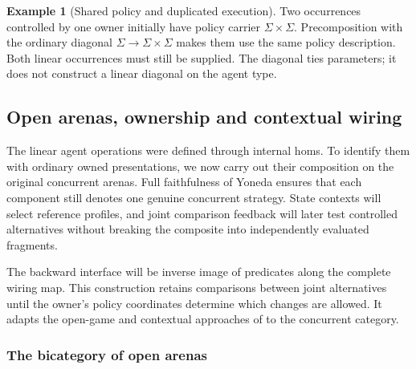 \documentclass[11pt,a4paper]{article}
\numberwithin{equation}{section}
\theoremstyle{definition}
\newtheorem{example}[theorem]{Example}
\theoremstyle{remark}
\theoremstyle{plain}
\begin{document}
\begin{example}[Shared policy and duplicated execution]
Two occurrences controlled by one owner initially have policy carrier
$\Sigma\times\Sigma$. Precomposition with the ordinary diagonal
$\Sigma\to\Sigma\times\Sigma$ makes them use the same policy description.
Both linear occurrences must still be supplied. The diagonal ties parameters;
it does not construct a linear diagonal on the agent type.
\end{example}

\subsection{Open arenas, ownership and contextual wiring}
\label{sec:egt-players}

The linear agent operations were defined through internal homs.
To identify them with ordinary owned presentations, we now carry out their
composition on the original concurrent arenas. Full faithfulness of
Yoneda ensures that each component still denotes one genuine concurrent
strategy. State contexts will select reference profiles, and joint
comparison feedback will later test controlled alternatives without
breaking the composite into independently evaluated fragments.

The backward interface will be inverse image of predicates along the
complete wiring map. This construction retains comparisons between joint
alternatives until the owner's policy coordinates determine which changes
are allowed. It adapts the open-game and contextual approaches of
\citet{GhaniEtAl2018,AtkeyEtAl2021,CapucciEtAl2022Agency,Hedges2020}
to the concurrent category.

\subsubsection{The bicategory of open arenas}
\end{document}
